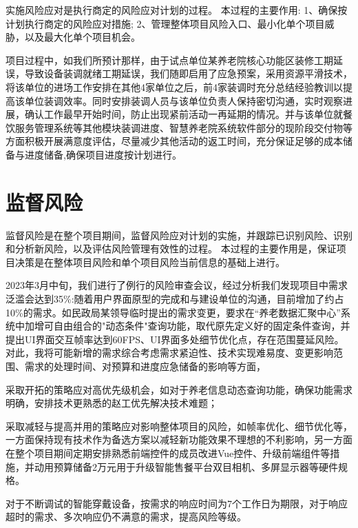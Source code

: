 \documentclass[UTF8]{../computerUniverse}
\begin{document}
实施风险应对是执行商定的风险应对计划的过程。
本过程的主要作用:
1、确保按计划执行商定的风险应对措施;
2、管理整体项目风险入口、最小化单个项目威胁，以及最大化单个项目机会。



项目过程中，如我们所预计那样，由于试点单位某养老院核心功能区装修工期延误，导致设备装调就绪工期延误，我们随即启用了应急预案，采用资源平滑技术，将该单位的进场工作安排在其他4家单位之后，前4家装调时充分总结经验教训以提高该单位装调效率。同时安排装调人员与该单位负责人保持密切沟通，实时观察进展，确认工作最早开始时间，防止出现紧前活动一再延期的情况。并与该单位就餐饮服务管理系统等其他模块装调进度、智慧养老院系统软件部分的现阶段交付物等方面积极开展满意度评估，尽量减少其他活动的返工时间，充分保证足够的成本储备与进度储备,确保项目进度按计划进行。%



\section{监督风险}
监督风险是在整个项目期间，监督风险应对计划的实施，并跟踪已识别风险、识别和分析新风险，以及评估风险管理有效性的过程。
本过程的主要作用是，保证项目决策是在整体项目风险和单个项目风险当前信息的基础上进行。



2023年3月中旬，我们进行了例行的风险审查会议，经过分析我们发现项目中需求泛滥会达到35\%:随着用户界面原型的完成和与建设单位的沟通，目前增加了约占10\%的需求。如民政局某领导临时提出的需求变更，要求在“养老数据汇聚中心”系统中加增可自由组合的"动态条件"查询功能，取代原先定义好的固定条件查询，并提出UI界面交互帧率达到60FPS、UI界面多处细节优化点，存在范围蔓延风险。
对此，我将可能新增的需求综合考虑需求紧迫性、技术实现难易度、变更影响范围、需求的处理时间、对预算和进度应急储备的影响等方面，

采取开拓的策略应对高优先级机会，如对于养老信息动态查询功能，确保功能需求明确，安排技术更熟悉的赵工优先解决技术难题；

采取减轻与提高并用的策略应对影响整体项目的风险，如帧率优化、细节优化等，一方面保持现有技术作为备选方案以减轻新功能效果不理想的不利影响，另一方面在整个项目期间定期安排熟悉前端控件的成员改进Vue控件、升级前端组件等措施，并动用预算储备2万元用于升级智能售餐平台双目相机、多屏显示器等硬件规格。

对于不断调试的智能穿戴设备，按需求的响应时间为7个工作日为期限，对于响应超时的需求、多次响应仍不满意的需求，提高风险等级。
\end{document}
